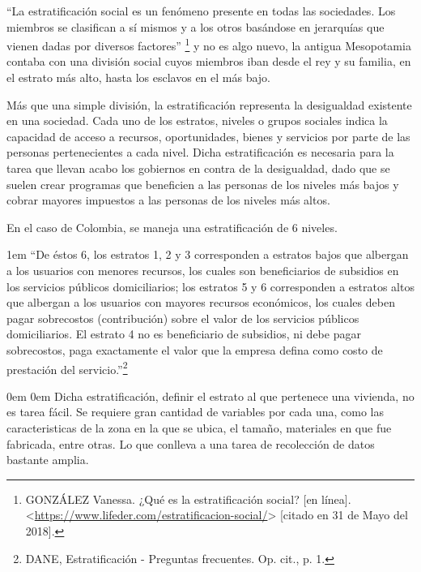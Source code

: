     “La estratificación social es un fenómeno presente en todas las sociedades. Los miembros se clasifican a sí mismos y a los otros basándose en jerarquías que vienen dadas por diversos factores”
    \footnote[8]{GONZÁLEZ Vanessa. ¿Qué es la estratificación social? [en línea]. <\url{https://www.lifeder.com/estratificacion-social/}> [citado en 31 de Mayo del 2018].} y no es algo nuevo, la antigua Mesopotamia contaba con una división social cuyos miembros iban desde el rey y su familia, en el estrato más alto, hasta los esclavos en el más bajo.
    
    Más que una simple división, la estratificación representa la desigualdad existente en una sociedad. Cada uno de los estratos, niveles o grupos sociales indica la capacidad de acceso a recursos, oportunidades, bienes y servicios por parte de las personas pertenecientes a cada nivel. Dicha estratificación es necesaria para la tarea que llevan acabo los gobiernos en contra de la desigualdad, dado que se suelen crear programas que beneficien a las personas de los niveles más bajos y cobrar mayores impuestos a las personas de los niveles más altos.
    
    En el caso de Colombia, se maneja una estratificación de 6 niveles.

	\leftskip1em
	\rightskip\leftskip
	{\footnotesize \hspace{\parindent} “De éstos 6, los estratos 1, 2 y 3 corresponden a estratos bajos que albergan a los usuarios con menores recursos, los cuales son beneficiarios de subsidios en los servicios públicos domiciliarios; los estratos 5 y 6 corresponden a estratos altos que albergan a los usuarios con mayores recursos económicos, los cuales deben pagar sobrecostos (contribución) sobre el valor de los servicios públicos domiciliarios. El estrato 4 no es beneficiario de subsidios, ni debe pagar sobrecostos, paga exactamente el valor que la empresa defina como costo de prestación del servicio.”\footnote[9]{DANE, Estratificación - Preguntas frecuentes. Op. cit., p. 1.}}
	
	\leftskip0em
	\rightskip0em
    Dicha estratificación, definir el estrato al que pertenece una vivienda, no es tarea fácil. Se requiere gran cantidad de variables por cada una, como las caracteristicas de la zona en la que se ubica, el tamaño, materiales en que fue fabricada, entre otras. Lo que conlleva a una tarea de recolección de datos bastante amplia.
    
    
